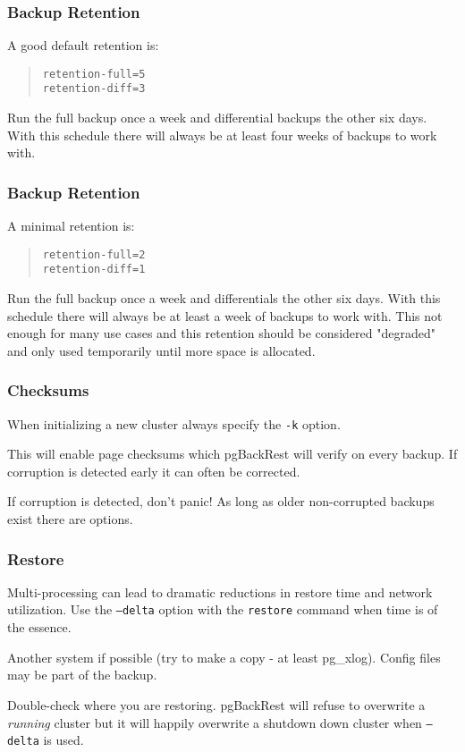 \begin{frame}[fragile]
    \frametitle{Backup Retention}

    A good default retention is:

    \begin{quote}\begin{verbatim}
retention-full=5
retention-diff=3
    \end{verbatim}\end{quote}\vspace{-1em}

    Run the full backup once a week and differential backups the other six days.
    \vspace{1em}
    With this schedule there will always be at least four weeks of backups to work with.
\end{frame}

\begin{frame}[fragile]
    \frametitle{Backup Retention}

    A minimal retention is:

    \begin{quote}\begin{verbatim}
retention-full=2
retention-diff=1
    \end{verbatim}\end{quote}\vspace{-1em}

    Run the full backup once a week and differentials the other six days.
    \vspace{1em}
    With this schedule there will always be at least a week of backups to work with.  This not enough for many use cases and this retention should be considered "degraded" and only used temporarily until more space is allocated.
\end{frame}

\begin{frame}
    \frametitle{Checksums}

    When initializing a new cluster always specify the \texttt{-k} option.

    This will enable page checksums which pgBackRest will verify on every backup.  If corruption is detected early it can often be corrected.

    If corruption is detected, don't panic!  As long as older non-corrupted backups exist there are options.
\end{frame}

\begin{frame}
    \frametitle{Restore}

    Multi-processing can lead to dramatic reductions in restore time and network utilization.  Use the \texttt{--delta} option with the \texttt{restore} command when time is of the essence.

    Another system if possible (try to make a copy - at least pg_xlog).
    Config files may be part of the backup.

    Double-check where you are restoring.  pgBackRest will refuse to overwrite a \textit{running} cluster but it will happily overwrite a shutdown down cluster when \texttt{--delta} is used.
\end{frame}

